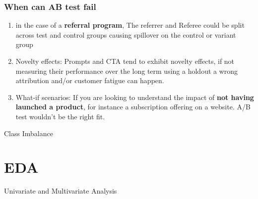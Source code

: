 \documentclass{beamer}
\begin{document}
\begin{frame}[plain]
\end{frame}

\begin{frame}\frametitle{When can AB test fail}
	\begin{enumerate}
		\item in the case of a \textbf{referral program}, The referrer and Referee could be split across test and control groups causing spillover on the control or variant group
		\item Novelty effects: Prompts and CTA tend to exhibit novelty effects, if not measuring their performance over the long term using a holdout a wrong attribution and/or customer fatigue can happen.
		\item What-if scenarios: If you are looking to understand the impact of \textbf{not having launched a product}, for instance a subscription offering on a website. A/B test wouldn’t be the right fit.
	\end{enumerate}
\end{frame}


\begin{frame}
	Class Imbalance
\end{frame}



\section{EDA}
\begin{frame}
	Univariate and Multivariate Analysis
\end{frame}
\end{document}
